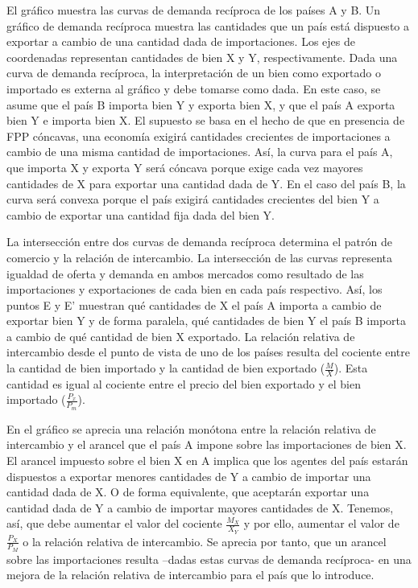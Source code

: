 \documentclass{nuevotema}
\begin{document}
El gráfico muestra las curvas de demanda recíproca de los países A y B. Un gráfico de demanda recíproca muestra las cantidades que un país está dispuesto a exportar a cambio de una cantidad dada de importaciones. Los ejes de coordenadas representan cantidades de bien X y Y, respectivamente. Dada una curva de demanda recíproca, la interpretación de un bien como exportado o importado es externa al gráfico y debe tomarse como dada. En este caso, se asume que el país B importa bien Y y exporta bien X, y que el país A exporta bien Y e importa bien X. El supuesto se basa en el hecho de que en presencia de FPP cóncavas, una economía exigirá cantidades crecientes de importaciones a cambio de una misma cantidad de importaciones. Así, la curva para el país A, que importa X y exporta Y será cóncava porque exige cada vez mayores cantidades de X para exportar una cantidad  dada de Y. En el caso del país B, la curva será convexa porque el país exigirá cantidades crecientes del bien Y a cambio de exportar una cantidad fija dada del bien Y. 

La intersección entre dos curvas de demanda recíproca determina el patrón de comercio y la relación de intercambio. La intersección de las curvas representa igualdad de oferta y demanda en ambos mercados como resultado de las importaciones y exportaciones de cada bien en cada país respectivo. Así, los puntos E y E' muestran qué cantidades de X el país A importa a cambio de exportar bien Y y de forma paralela, qué cantidades de bien Y el país B importa a cambio de qué cantidad de bien X exportado. La relación relativa de intercambio desde el punto de vista de uno de los países resulta del cociente entre la cantidad de bien importado y la cantidad de bien exportado ($\frac{M}{X}$). Esta cantidad es igual al cociente entre el precio del bien exportado y el bien importado ($\frac{P_x}{P_m}$).

En el gráfico se aprecia una relación monótona entre la relación relativa de intercambio y el arancel que el país A impone sobre las importaciones de bien X. El arancel impuesto sobre el bien X en A implica que los agentes del país estarán dispuestos a exportar menores cantidades de Y a cambio de importar una cantidad dada de X. O de forma equivalente, que aceptarán exportar una cantidad dada de Y a cambio de importar mayores cantidades de X. Tenemos, así, que debe aumentar el valor del cociente $\frac{M_X}{X_Y}$ y por ello, aumentar el valor de $\frac{P_X}{P_M}$ o la relación relativa de intercambio. Se aprecia por tanto, que un arancel sobre las importaciones resulta --dadas estas curvas de demanda recíproca- en una mejora de la relación relativa de intercambio para el país que lo introduce.
\end{document}
